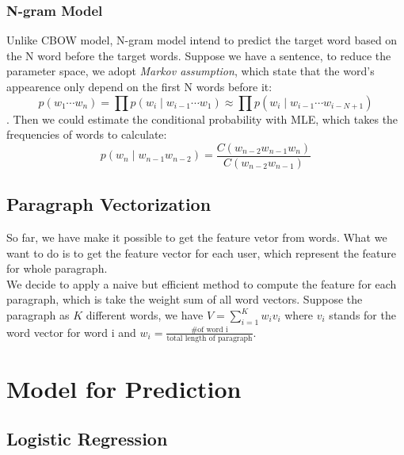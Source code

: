 \documentclass{article}
\begin{document}
\subsubsection{N-gram Model}
Unlike CBOW model, N-gram model intend to predict the target word based on the N word before the target words. Suppose we have a sentence, to reduce the parameter space, we adopt \emph{Markov assumption}, which state that the word's appearence only depend on the first N words before it: $$p\left(w_{1} \cdots w_{n}\right)=\prod p\left(w_{i} \mid w_{i-1} \cdots w_{1}\right) \approx \prod p\left(w_{i} \mid w_{i-1} \cdots w_{i-N+1}\right)$$. Then we could estimate the conditional probability with MLE, which takes the frequencies of words to calculate:$$p\left(w_{n} \mid w_{n-1} w_{n-2}\right)=\frac{C\left(w_{n-2} w_{n-1} w_{n}\right)}{C\left(w_{n-2} w_{n-1}\right)}$$

\subsection{Paragraph Vectorization}
So far, we have make it possible to get the feature vetor from words. What we want to do is to get the feature vector for each user, which represent the feature for whole paragraph.\\
We decide to apply a naive but efficient method to compute the feature for each paragraph, which is take the weight sum of all word vectors. Suppose the paragraph as $K$ different words, we have $V = \sum_{i=1}^{K}w_iv_i$ where $v_i$ stands for the word vector for word i and $w_i = \frac{\text{\# of word i}}{\text{total length of paragraph}}$.

\section{Model for Prediction}
\subsection{Logistic Regression}

\end{document}
